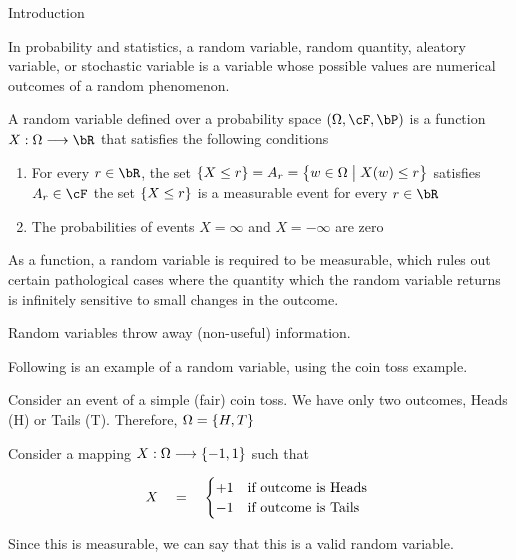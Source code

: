 \documentclass{article}
\begin{document}
\makeheader%

\begin{ssection}{Introduction}

	In probability and statistics, a random variable, random quantity, aleatory variable, or stochastic variable is a variable whose possible values are numerical outcomes of a random phenomenon. 
	
	\begin{definition}
		A random variable defined over a probability space $\para{\Omega, \cF, \bP}$ is a function $X : \Omega \lra \bR$ that satisfies the following conditions

		\begin{enumerate}
			\item For every $r \in \bR$, the set $\left\{ {X \le r} \right\} = A_r = \left\{ {w \in \Omega \;\big|\; X(w) \le r} \right\}$ satisfies $A_r \in \cF$  the set $\left\{ {X \le r} \right\}$ is a measurable event for every $r \in \bR$
			\item The probabilities of events $X = \infty$ and $X = -\infty$ are zero
		\end{enumerate}
	\end{definition}
	
	As a function, a random variable is required to be measurable, which rules out certain pathological cases where the quantity which the random variable returns is infinitely sensitive to small changes in the outcome. \br

	Random variables throw away (non-useful) information. \br

	Following is an example of a random variable, using the coin toss example.

	\begin{example}
		Consider an event of a simple (fair) coin toss. We have only two outcomes, Heads (H) or Tails (T). Therefore, $\Omega = \left\{ {H, T} \right\}$ \br
		
		Consider a mapping $X : \Omega \longrightarrow \left\{ {-1, 1} \right\}$ such that 

		\begin{align*}
			X	\quad = \quad	\begin{cases}
				+1	&	\text{if outcome is Heads}\,\, \\
				-1	&	\text{if outcome is Tails}\,\,
			\end{cases}
		\end{align*}

		Since this is measurable, we can say that this is a valid random variable.
	\end{example}


\end{ssection}
\end{document}

